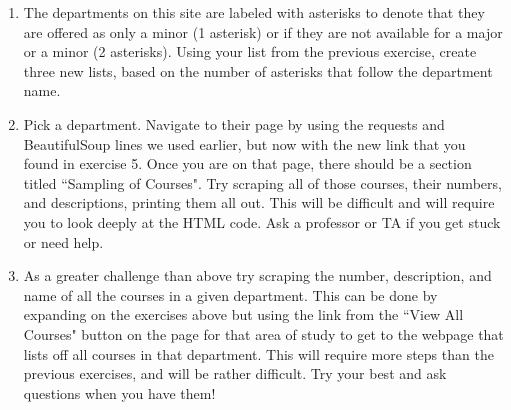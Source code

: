 \documentclass[11pt, letterpaper, onecolumn, oneside, final]{article}
\begin{document}
\begin{enumerate}
    \item The departments on this site are labeled with asterisks to denote that they are offered as only a minor (1 asterisk) or if they are not available for a major or a minor (2 asterisks). Using your list from the previous exercise, create three new lists, based on the number of asterisks that follow the department name. 
    
    \item Pick a department. Navigate to their page by using the {\consolas requests} and {\consolas BeautifulSoup} lines we used earlier, but now with the new link that you found in exercise 5. Once you are on that page, there should be a section titled ``Sampling of Courses". Try scraping all of those courses, their numbers, and descriptions, printing them all out. This will be difficult and will require you to look deeply at the HTML code. Ask a professor or TA if you get stuck or need help.
    
    \item As a greater challenge than above try scraping the number, description, and name of all the courses in a given department. This can be done by expanding on the exercises above but using the link from the ``View All Courses" button on the page for that area of study to get to the webpage that lists off all courses in that department. This will require more steps than the previous exercises, and will be rather difficult. Try your best and ask questions when you have them!
    
\end{enumerate}
\end{document}
